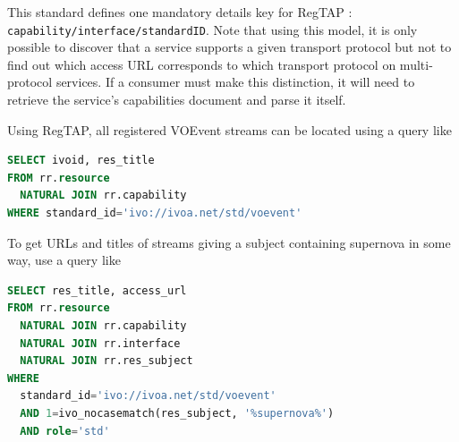 \documentclass[11pt,a4paper]{ivoa}
\begin{document}
This standard defines one mandatory details key for RegTAP
\citep{2019ivoa.spec.1011D}: \verb|capability/interface/standardID|.
Note that using this model, it is only possible to discover that a
service supports a given transport protocol but not to find out which
access URL corresponds to which transport protocol on multi-protocol
services.  If a consumer must make this distinction, it will need to
retrieve the service's capabilities document and parse it itself.

Using RegTAP, all registered VOEvent streams
can be located using a query like

\begin{lstlisting}[language=SQL]
SELECT ivoid, res_title
FROM rr.resource
  NATURAL JOIN rr.capability
WHERE standard_id='ivo://ivoa.net/std/voevent'
\end{lstlisting}

To get URLs and titles of streams giving a subject containing supernova
in some way, use a query like

\begin{lstlisting}[language=SQL]
SELECT res_title, access_url
FROM rr.resource
  NATURAL JOIN rr.capability
  NATURAL JOIN rr.interface
  NATURAL JOIN rr.res_subject
WHERE 
  standard_id='ivo://ivoa.net/std/voevent'
  AND 1=ivo_nocasematch(res_subject, '%supernova%')
  AND role='std'
\end{lstlisting}
\end{document}

